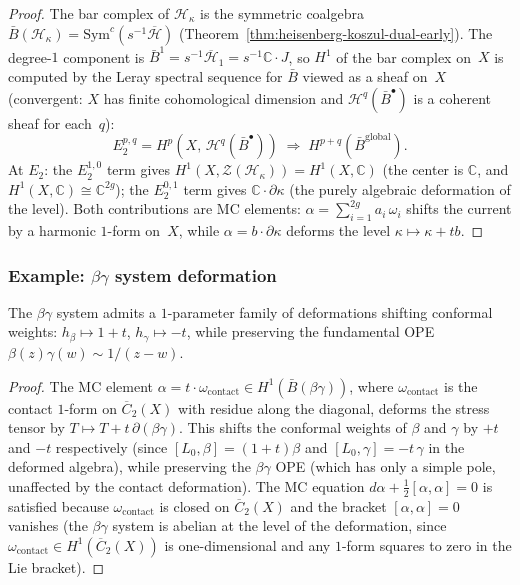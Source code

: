 \begin{proof}
The bar complex of $\mathcal{H}_\kappa$ is the symmetric coalgebra
$\bar{B}(\mathcal{H}_\kappa) = \mathrm{Sym}^c(s^{-1}\overline{\mathcal{H}})$
(Theorem~\ref{thm:heisenberg-koszul-dual-early}). The degree-$1$
component is $\bar{B}^1 = s^{-1}\overline{\mathcal{H}}_1 = s^{-1}
\mathbb{C} \cdot J$, so $H^1$ of the bar complex on~$X$ is computed
by the Leray spectral sequence for $\bar{B}$ viewed as a sheaf
on~$X$ (convergent: $X$ has finite cohomological dimension and
$\mathcal{H}^q(\bar{B}^\bullet)$ is a coherent sheaf for each~$q$):
\[
E_2^{p,q} = H^p(X,\, \mathcal{H}^q(\bar{B}^{\bullet}))
\;\Longrightarrow\; H^{p+q}(\bar{B}^{\mathrm{global}}).
\]
At $E_2$: the $E_2^{1,0}$ term gives
$H^1(X, \mathcal{Z}(\mathcal{H}_\kappa)) = H^1(X, \mathbb{C})$
(the center is $\mathbb{C}$, and $H^1(X, \mathbb{C}) \cong
\mathbb{C}^{2g}$); the $E_2^{0,1}$ term gives $\mathbb{C} \cdot
\partial\kappa$ (the purely algebraic deformation of the level).
Both contributions are MC elements:
$\alpha = \sum_{i=1}^{2g} a_i\, \omega_i$ shifts the current by a
harmonic $1$-form on~$X$, while $\alpha = b \cdot \partial\kappa$
deforms the level $\kappa \mapsto \kappa + tb$.
\end{proof}

\subsubsection{\texorpdfstring{Example: $\beta\gamma$ system deformation}{Example: beta-gamma system deformation}}

\begin{proposition}
\label{prop:betagamma-deformations}
The $\beta\gamma$ system admits a $1$-parameter family of deformations
shifting conformal weights:
$h_\beta \mapsto 1 + t$, $h_\gamma \mapsto -t$, while preserving the
fundamental OPE $\beta(z)\gamma(w) \sim 1/(z-w)$.
\end{proposition}

\begin{proof}
The MC element $\alpha = t \cdot \omega_{\mathrm{contact}} \in
H^1(\bar{B}(\beta\gamma))$, where $\omega_{\mathrm{contact}}$ is the
contact $1$-form on $\overline{C}_2(X)$ with residue along the diagonal,
deforms the stress tensor by
$T \mapsto T + t\,\partial(\beta\gamma)$. This shifts the conformal
weights of $\beta$ and $\gamma$ by $+t$ and $-t$ respectively (since
$[L_0, \beta] = (1{+}t)\beta$ and $[L_0, \gamma] = -t\,\gamma$ in
the deformed algebra), while preserving the $\beta\gamma$ OPE (which
has only a simple pole, unaffected by the contact deformation).
The MC equation $d\alpha + \frac{1}{2}[\alpha,\alpha] = 0$ is
satisfied because $\omega_{\mathrm{contact}}$ is closed on
$\overline{C}_2(X)$ and the bracket $[\alpha, \alpha] = 0$
vanishes (the $\beta\gamma$ system is abelian at the level of
the deformation, since $\omega_{\mathrm{contact}} \in
H^1(\overline{C}_2(X))$ is one-dimensional and any $1$-form
squares to zero in the Lie bracket).
\end{proof}

